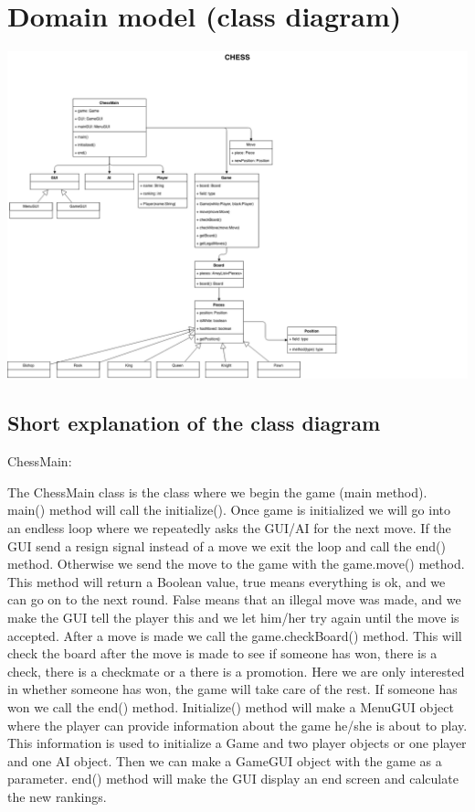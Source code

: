 \documentclass{article}
\begin{document}
    \section{Domain model (class diagram)}
    \includegraphics[scale=0.35]{class-diagram.png}
    
    \subsection{Short explanation of the class diagram}
    
        ChessMain:\\
        \begin{outline}
            The ChessMain class is the class where we begin the game (main method).
            \1 main() method will call the initialize(). Once game is initialized we
            will go into an endless loop where we repeatedly asks the GUI/AI for the 
            next move. If the GUI send a resign signal instead of a move we exit the 
            loop and call the end() method. Otherwise we send the move to the game 
            with the game.move() method. This method will return a Boolean value, true means
            everything is ok, and we can go on to the next round. False means that an
            illegal move was made, and we make the GUI tell the player this
            and we let him/her try again until the move is accepted. After a move is made
            we call the game.checkBoard() method. This will check the board after the move
            is made to see if someone has won, there is a check, there is a checkmate or a
            there is a promotion. Here we are only interested in whether someone has won,
            the game will take care of the rest. If someone has won we call the end() method.
            \1 Initialize() method will make a MenuGUI object where the player can 
            provide information about the game he/she is about to play. This information
            is used to initialize a Game and two player objects or one player and one AI object.
            Then we can make a GameGUI object with the game as a parameter.
            \1 end() method will make the GUI display an end screen and calculate
            the new rankings.
        \end{outline}
        
\end{document}
